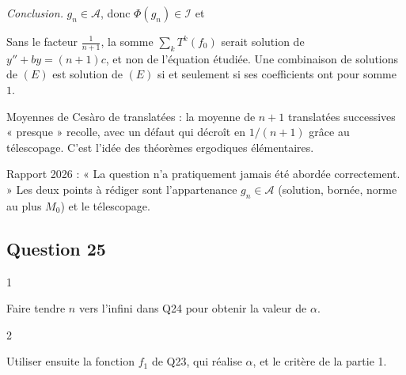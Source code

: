 \documentclass[11pt,a4paper]{article}
\newcommand{\equationajustee}[1]{%
  \sbox{\boiteequation}{$\displaystyle #1$}%
  \ifdim\wd\boiteequation>\linewidth
    \[\resizebox{\linewidth}{!}{\usebox{\boiteequation}}\]%
  \else
    \[#1\]%
  \fi}
\begin{document}
\emph{Conclusion.} \(g_n\in\mathcal A\), donc \(\Phi(g_n)\in\mathcal I\) et
\equationajustee{\boxed{\begin{aligned}
\forall n\in\mathbb N,\quad\alpha&\le\Phi(g_n)\\
&\le\frac{2(M_0+M_1)}{n+1}.
\end{aligned}}}

\begin{piege}

Sans le facteur \(\frac1{n+1}\), la somme \(\sum_kT^k(f_0)\) serait solution de \(y''+by=(n+1)c\), et non de l'équation étudiée. Une combinaison de solutions de \((E)\) est solution de \((E)\) si et seulement si ses coefficients ont pour somme \(1\).

\end{piege}

\begin{methode}

Moyennes de Cesàro de translatées : la moyenne de \(n+1\) translatées successives « presque » recolle, avec un défaut qui décroît en \(1/(n+1)\) grâce au télescopage. C'est l'idée des théorèmes ergodiques élémentaires.

\end{methode}

\begin{jury}

Rapport 2026 : « La question n'a pratiquement jamais été abordée correctement. » Les deux points à rédiger sont l'appartenance \(g_n\in\mathcal A\) (solution, bornée, norme au plus \(M_0\)) et le télescopage.

\end{jury}

\hypertarget{question-25}{%
\subsection{Question 25}\label{question-25}}

\begin{indication}{1}

Faire tendre \(n\) vers l'infini dans Q24 pour obtenir la valeur de \(\alpha\).

\end{indication}

\begin{indication}{2}

Utiliser ensuite la fonction \(f_1\) de Q23, qui réalise \(\alpha\), et le critère de la partie 1.

\end{indication}
\end{document}
